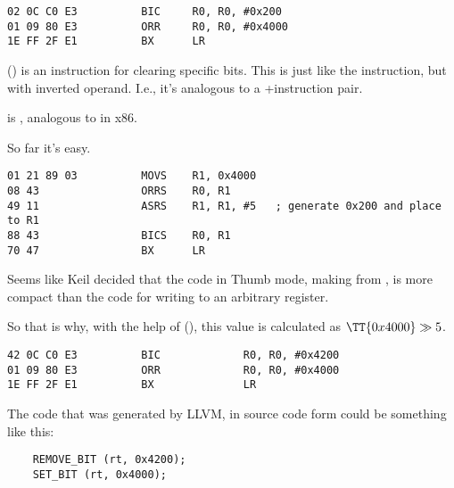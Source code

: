 
\begin{lstlisting}[caption=\OptimizingKeilVI (\ARMMode)]
02 0C C0 E3          BIC     R0, R0, #0x200
01 09 80 E3          ORR     R0, R0, #0x4000
1E FF 2F E1          BX      LR
\end{lstlisting}

 () is an instruction for clearing 
specific bits. This is just like the \AND instruction, but with inverted operand.
I.e., it's analogous to a \NOT+\AND instruction pair.

 is , analogous to \OR in x86.

So far it's easy.


\begin{lstlisting}[caption=\OptimizingKeilVI (\ThumbMode)]
01 21 89 03          MOVS    R1, 0x4000
08 43                ORRS    R0, R1
49 11                ASRS    R1, R1, #5   ; generate 0x200 and place to R1
88 43                BICS    R0, R1
70 47                BX      LR
\end{lstlisting}

Seems like Keil decided that the code in Thumb mode,
making  from , 
is more compact than the code 
for writing  to an arbitrary register.


So that is why, with the help of  (\ASRdesc), this value is calculated as $\TT{0x4000} \gg 5$.

\label{anomaly:LLVM}
\myindex{\CompilerAnomaly}

\begin{lstlisting}[caption=\OptimizingXcodeIV (\ARMMode),label=ARM_leaf_example3]
42 0C C0 E3          BIC             R0, R0, #0x4200
01 09 80 E3          ORR             R0, R0, #0x4000
1E FF 2F E1          BX              LR
\end{lstlisting}

The code that was generated by LLVM, in source code form could be something like this:

\begin{lstlisting}
    REMOVE_BIT (rt, 0x4200);
    SET_BIT (rt, 0x4000);
\end{lstlisting}

